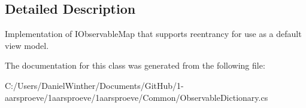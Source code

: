 \subsection{Detailed Description}
Implementation of I\+Observable\+Map that supports reentrancy for use as a default view model. 



The documentation for this class was generated from the following file\+:\begin{DoxyCompactItemize}
\item 
C\+:/\+Users/\+Daniel\+Winther/\+Documents/\+Git\+Hub/1-\/aarsproeve/1aarsproeve/1aarsproeve/\+Common/Observable\+Dictionary.\+cs\end{DoxyCompactItemize}
